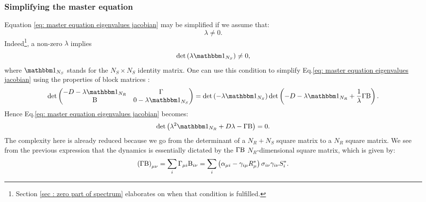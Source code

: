 \documentclass[12pt, titlepage]{report}
\begin{document}
\subsubsection{Simplifying the master equation}\label{section: non marginal equilibria}
Equation \eqref{eq: master equation eigenvalues jacobian} may be simplified if we assume that:
\begin{equation}
\lambda \neq 0.
\end{equation}
Indeed\footnote{Section \ref{sec : zero part of spectrum} elaborates on when that condition is fulfilled.}, a non-zero $\lambda$ implies
\begin{equation}
\det\left(\lambda \identity{N_S}\right)\neq 0,
\end{equation}
where $\identity{N_S}$ stands for the $N_S \times N_S$ identity matrix. One can use this condition to simplify Eq.\eqref{eq: master equation eigenvalues jacobian} using the properties of block matrices \cite{powell_calculating_2011}:
\begin{equation}
\det
\begin{pmatrix}
  -D - \lambda \identity{N_R}  & \Gamma \\
  \Beta & 0-\lambda \identity{N_S}
\end{pmatrix} =
\det\left(-\lambda \identity{N_S}\right)\det\left(-D- \lambda\identity{N_R}+\frac{1}{\lambda}\Gamma \Beta\right).
\end{equation}
Hence Eq.\eqref{eq: master equation eigenvalues jacobian} becomes:
\begin{equation}
\det\left(\lambda^2 \identity{N_R}+D \lambda-\Gamma \Beta\right)=0. \label{eq: master equation non marginal}
\end{equation}
The complexity here is already reduced because we go from the determinant of a $N_R+N_S$ square matrix to a $N_R$ square matrix. We see from the previous expression that the dynamics is essentially dictated by the $\Gamma \text{B}$ $N_R$-dimensional square matrix, which is given by:
\begin{equation}
\left(\Gamma \text{B}\right)_{\mu \nu} = \sum_i \Gamma_{\mu i} \text{B}_{i \nu} = \sum_i \left(\alpha_{\mu i}-\gamma_{i \mu} R^*_\mu \right)\sigma_{i\nu}\gamma_{i\nu}S^*_i. \label{eq : definition Gamma Beta}
\end{equation}
\end{document}
